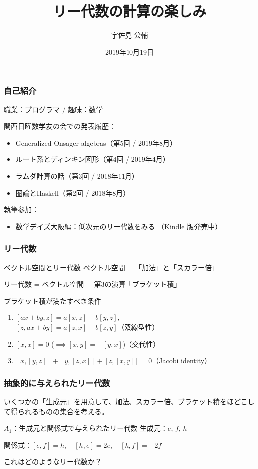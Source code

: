 \documentclass{beamer}
\title{リー代数の計算の楽しみ}
\author{宇佐見 公輔}
\date{2019年10月19日}
\begin{document}
\maketitle

\begin{frame}
    \frametitle{自己紹介}

    職業：プログラマ / 趣味：数学

    \bigskip

    関西日曜数学友の会での発表履歴：
    \begin{itemize}
        \item Generalized Onsager algebras（第5回 / 2019年8月）
        \item ルート系とディンキン図形（第4回 / 2019年4月）
        \item ラムダ計算の話（第3回 / 2018年11月）
        \item 圏論とHaskell（第2回 / 2018年8月）
    \end{itemize}

    \bigskip

    執筆参加：
    \begin{itemize}
        \item 数学デイズ大阪編：低次元のリー代数をみる \scriptsize{（Kindle 版発売中）}
    \end{itemize}
\end{frame}

\begin{frame}
    \frametitle{リー代数}

    \begin{block}{ベクトル空間とリー代数}
        ベクトル空間 = 「加法」と「スカラー倍」

        リー代数 = ベクトル空間 + 第3の演算「ブラケット積」
    \end{block}

    ブラケット積が満たすべき条件
    \begin{enumerate}
        \item \([ax + by, z] = a[x, z] + b[y, z]\), \\
              \([z, ax + by] = a[z, x] + b[z, y]\)（双線型性）
        \item \([x, x] = 0\) (\(\implies [x, y] = - [y, x]\))（交代性）
        \item \([x, [y, z]] + [y, [z, x]] + [z, [x, y]] = 0\)（Jacobi identity）
    \end{enumerate}
\end{frame}

\begin{frame}
    \frametitle{抽象的に与えられたリー代数}

    いくつかの「生成元」を用意して、加法、スカラー倍、ブラケット積をほどこして得られるものの集合を考える。

    \begin{block}{\(A_1\)：生成元と関係式で与えられたリー代数}
        生成元：\(e,\, f,\, h\)

        関係式：\([e, f] = h, \quad [h, e] = 2e, \quad [h, f] = -2f\)
    \end{block}

    これはどのようなリー代数か？
\end{frame}
\end{document}
